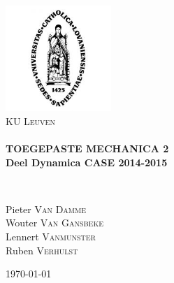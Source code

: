 \begin{center}

\includegraphics[width=0.30\textwidth]{./kuleuven}~\\[1cm]

\textsc{\LARGE KU Leuven}\\[1.5cm]


\HRule \\[0.4cm]
{ \huge \bfseries TOEGEPASTE MECHANICA 2 \\
Deel Dynamica CASE 2014-2015 \\[0.4cm] }

\HRule \\[1.5cm]
\vspace{5cm}
\noindent
\begin{flushleft} \large
Pieter \textsc{Van Damme}\\
Wouter \textsc{Van Gansbeke}\\
Lennert \textsc{Vanmunster}\\
Ruben \textsc{Verhulst}
\end{flushleft}


\vfill

{\large \today}

\end{center}